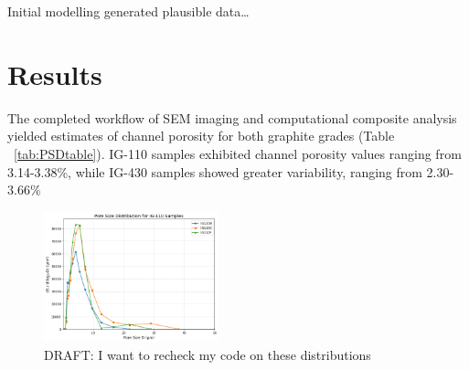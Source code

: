 \documentclass[review]{elsarticle}
\begin{document}
  Initial modelling generated plausible data…

\section{Results}

\begin{table}
  \centering
  \caption{Pore Size Distribution (PSD) and summary characteristics for IG-110 and IG-430 samples, tabulating number of pores, total pore area, and channel porosity.}
  \label{tab:PSDtable}
\end{table}

The completed workflow of SEM imaging and computational composite analysis
yielded estimates of channel porosity for both graphite grades (Table
~\ref{tab:PSDtable}). IG-110 samples exhibited channel porosity values ranging
from 3.14-3.38\%, while IG-430 samples showed greater variability, ranging from
2.30-3.66\%

\begin{figure}
    \centering
    \includegraphics[width=0.45\textwidth]{./Media/IG110 ds LogD .png}
    \caption{DRAFT: I want to recheck my code on these distributions}
    \label{fig:IG110LogPSDs}
\end{figure}
\end{document}
